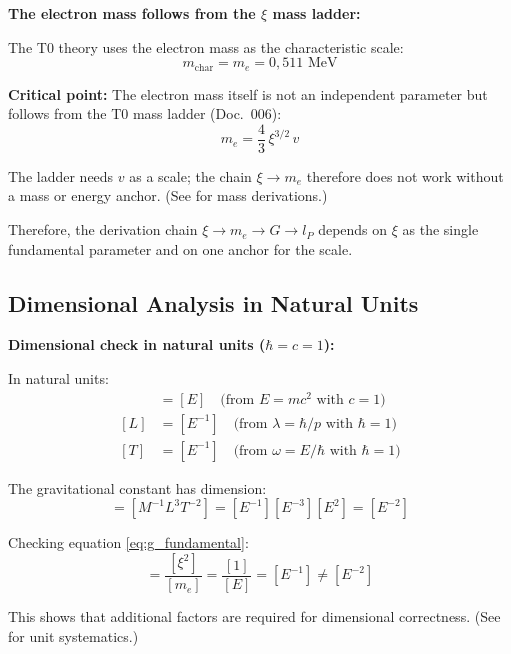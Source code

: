 	\begin{insight}
		\textbf{The electron mass follows from the $\xi$ mass ladder:}
		
		The T0 theory uses the electron mass as the characteristic scale:
		\begin{equation}
			m_{\text{char}} = m_e = 0{,}511 \text{ MeV}
			\label{eq:characteristic_mass}
		\end{equation}
		
		\textbf{Critical point:} The electron mass itself is not an independent parameter but follows from the T0 mass ladder (Doc.~006):
		\begin{equation}
			m_e = \frac{4}{3}\,\xi^{3/2}\,v
		\end{equation}
		
		The ladder needs $v$ as a scale; the chain $\xi \to m_e$ therefore does not work without a mass or energy anchor. (See \cite{T0_particle_masses_En} for mass derivations.)
		
		Therefore, the derivation chain $\xi \to m_e \to G \to l_P$ depends on $\xi$ as the single fundamental parameter and on one anchor for the scale.
	\end{insight}

	\subsection{Dimensional Analysis in Natural Units}
	
	\begin{derivation}
		\textbf{Dimensional check in natural units ($\hbar = c = 1$):}
		
		In natural units:
		\begin{align}
			[M] &= [E] \quad \text{(from } E = mc^2 \text{ with } c = 1\text{)} \\
			[L] &= [E^{-1}] \quad \text{(from } \lambda = \hbar/p \text{ with } \hbar = 1\text{)} \\
			[T] &= [E^{-1}] \quad \text{(from } \omega = E/\hbar \text{ with } \hbar = 1\text{)}
		\end{align}
		
		The gravitational constant has dimension:
		\begin{equation}
			[G] = [M^{-1}L^3T^{-2}] = [E^{-1}][E^{-3}][E^2] = [E^{-2}]
		\end{equation}
		
		Checking equation \eqref{eq:g_fundamental}:
		\begin{equation}
			[G] = \frac{[\xi^2]}{[m_e]} = \frac{[1]}{[E]} = [E^{-1}] \neq [E^{-2}]
		\end{equation}
		
		This shows that additional factors are required for dimensional correctness. (See \cite{natural_units_systematics_En} for unit systematics.)
	\end{derivation}
	
